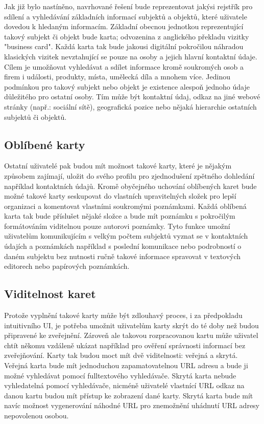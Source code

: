 Jak již bylo nastíněno, navrhované řešení bude reprezentovat jakýsi rejstřík pro sdílení a vyhledávání základních informací
subjektů a objektů, které uživatele dovedou k hledaným informacím.
Základní obecnou jednotkou reprezentující takový subjekt či objekt bude karta; odvozenina z anglického překladu vizitky "business card".
Každá karta tak bude jakousi digitální pokročilou náhradou klasických vizitek nevztahující se pouze na osoby a jejich
hlavní kontaktní údaje.
Cílem je umožňovat vyhledávat a sdílet informace kromě soukromých osob a firem i události, produkty, místa, umělecká díla a mnohem více.
Jedinou podmínkou pro takový subjekt nebo objekt je existence alespoň jednoho údaje důležitého pro ostatní osoby.
Tím může být kontaktní údaj, odkaz na jiné webové stránky (např.: sociální sítě), geografická pozice nebo
nějaká hierarchie ostatních subjektů či objektů.

	\subsection{Oblíbené karty}

	Ostatní uživatelé pak budou mít možnost takové karty, které je nějakým způsobem zajímají, uložit do svého profilu pro
	zjednodušení zpětného dohledání například kontaktních údajů.
	Kromě obyčejného uchování oblíbených karet bude možné takové karty seskupovat do vlastních upravitelných složek pro
	lepší organizaci a komentovat vlastními soukromými poznámkami.
	Každá oblíbená karta tak bude příslušet nějaké složce a bude mít poznámku s pokročilým formátováním viditelnou pouze
	autorovi poznámky.
	Tyto funkce umožní uživatelům komunikujícím s velkým počtem subjektů vyznat se v kontaktních údajích a poznámkách
	například s poslední komunikace nebo podrobností o daném subjektu bez nutnosti ručně takové informace spravovat v
	textových editorech nebo papírových poznámkách.

	\subsection{Viditelnost karet}

	Protože vyplnění takové karty může být zdlouhavý proces, i za předpokladu intuitivního \ac{UI}, je potřeba umožnit
	uživatelům karty skrýt do té doby než budou připravené ke zveřejnění.
	Zároveň ale takovou rozpracovanou kartu může uživatel chtít někomu vzdáleně ukázat například pro ověření správnosti informací
	bez zveřejňování.
	Karty tak budou moct mít dvě viditelnosti: veřejná a skrytá.
	Veřejná karta bude mít jednoduchou zapamatovatelnou URL adresu a bude ji možné vyhledávat pomocí fulltextového vyhledávače.
	Skrytá karta nebude vyhledatelná pomocí vyhledávače, nicméně uživatelé vlastnící URL odkaz na danou kartu budou mít přístup
	ke zobrazení dané karty.
	Skrytá karta bude mít navíc možnost vygenerování náhodné URL pro znemožnění uhádnutí URL adresy nepovolenou osobou.

